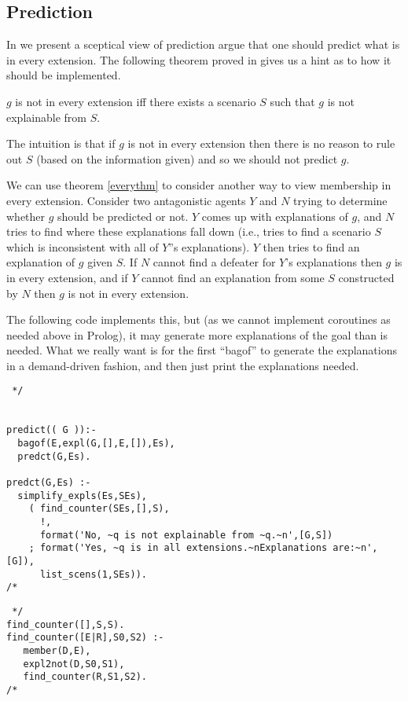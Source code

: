 \subsection{Prediction}
In \cite{poole:lf} we present a sceptical view of prediction
argue that one should predict what is in every extension.
The following theorem proved in \cite{poole:lf} gives us a hint
as to how it should be implemented.
\begin{theorem} \label{everythm}
$g$ is not in every extension iff there exists a scenario $S$ such
that $g$ is not explainable from $S$.
\end{theorem}

The intuition is that
if $g$ is not in every extension then there is no reason to rule out
$S$ (based on the information given) and so we should not predict $g$.

We can use theorem \ref{everythm} to consider another way to view membership
in every extension. Consider two antagonistic agents $Y$ and $N$ trying to
determine whether $g$ should be predicted or not. $Y$ comes
up with explanations of $g$, and $N$ tries to find where these explanations
fall down (i.e., tries to find a scenario $S$ which is inconsistent with
all of $Y$''s explanations). $Y$ then tries to find an explanation of $g$
given $S$.
If $N$ cannot find a defeater for $Y$'s explanations then
$g$ is in every extension, and if $Y$ cannot find an explanation from
some $S$ constructed by $N$ then $g$ is not in every extension.

The following code implements this, but (as we cannot implement
coroutines as needed above in Prolog), it may generate more
explanations of the goal than is needed. What we really want is for the
first ``bagof'' to generate the explanations in a demand-driven fashion,
and then just print the explanations needed.

\begin{verbatim} */
                     

predict(( G )):-
  bagof(E,expl(G,[],E,[]),Es),
  predct(G,Es). 
 
predct(G,Es) :- 
  simplify_expls(Es,SEs),
    ( find_counter(SEs,[],S),
      !,
      format('No, ~q is not explainable from ~q.~n',[G,S])
    ; format('Yes, ~q is in all extensions.~nExplanations are:~n',[G]),
      list_scens(1,SEs)).
/* \end{verbatim}

\begin{verbatim} */
find_counter([],S,S).
find_counter([E|R],S0,S2) :-
   member(D,E),
   expl2not(D,S0,S1),
   find_counter(R,S1,S2).
/* \end{verbatim}


